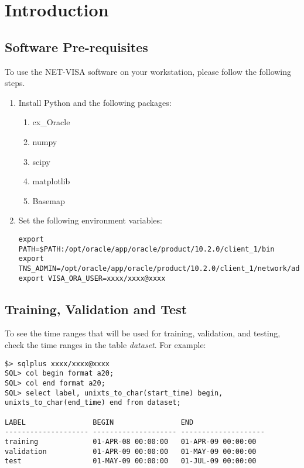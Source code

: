 

\chapter{Introduction}


\section{Software Pre-requisites}
To use the NET-VISA software on your workstation, please follow the
following steps.

\begin{enumerate}
\item Install Python and the following packages:
\begin{enumerate}
\item cx\_Oracle
\item numpy
\item scipy
\item matplotlib
\item Basemap
\end{enumerate}
\item Set the following environment variables:
{\footnotesize
\begin{verbatim}
export PATH=$PATH:/opt/oracle/app/oracle/product/10.2.0/client_1/bin
export TNS_ADMIN=/opt/oracle/app/oracle/product/10.2.0/client_1/network/admin
export VISA_ORA_USER=xxxx/xxxx@xxxx
\end{verbatim}
}
\end{enumerate}

\section{Training, Validation and Test}

To see the time ranges that will be used for training, validation, and
testing, check the time ranges in the table {\em dataset}. For example:
\begin{verbatim}
$> sqlplus xxxx/xxxx@xxxx
SQL> col begin format a20;
SQL> col end format a20;
SQL> select label, unixts_to_char(start_time) begin,
unixts_to_char(end_time) end from dataset;

LABEL                BEGIN                END
-------------------- -------------------- --------------------
training             01-APR-08 00:00:00   01-APR-09 00:00:00
validation           01-APR-09 00:00:00   01-MAY-09 00:00:00
test                 01-MAY-09 00:00:00   01-JUL-09 00:00:00

\end{verbatim}


